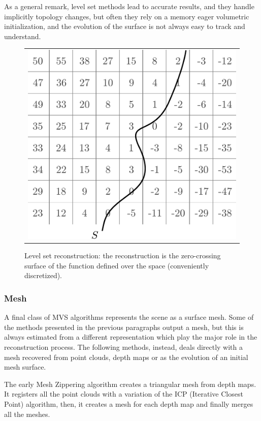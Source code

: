 As a general remark, level set methods lead to accurate results, and they handle implicitly topology changes, but often they rely on a memory eager volumetric initialization, and the evolution of the surface is not always easy to track and understand.


\begin{figure}[t]
\centering
 \begin{tabular}{c}
  \includegraphics[width=0.65\columnwidth]{./img/ch_soa/levelset}\\
 \end{tabular}
 \caption{Level set reconstruction: the reconstruction is the zero-crossing surface of the function defined over the space (conveniently discretized).}
 \label{fig:levelset}
\end{figure}
\subsubsection{Mesh}

A final class of MVS algorithms represents the scene as a surface mesh. Some of the methods presented in the previous paragraphs output a mesh, but this is always estimated from a different representation which play the major role in the reconstruction process.
The following methods, instead, deals directly with a mesh recovered from point clouds, depth maps or as the evolution of an initial mesh surface.

The early Mesh Zippering algorithm \cite{turk1994zippered} creates a triangular mesh from depth maps. It registers all the point clouds with a variation of the ICP (Iterative Closest Point) algorithm, then, it creates a mesh for each depth map and finally merges all the meshes.


